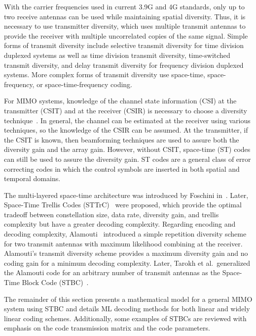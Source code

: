 
With the carrier frequencies used in current 3.9G and 4G standards, only up to two receive antennas can be used while maintaining spatial diversity. Thus, it is necessary to use transmitter diversity, which uses multiple transmit antennas to provide the receiver with multiple uncorrelated copies of the same signal. Simple forms of transmit diversity include selective transmit diversity for time division duplexed systems as well as time division transmit diversity, time-switched transmit diversity, and delay transmit diversity for frequency division duplexed systems. More complex forms of transmit diversity use space-time, space-frequency, or space-time-frequency coding.

For MIMO systems, knowledge of the channel state information (CSI) at the transmitter (CSIT) and at the receiver (CSIR) is necessary to choose a diversity technique~\cite{caire03,weingarten06}. In general, the channel can be estimated at the receiver using various techniques, so the knowledge of the CSIR can be assumed. At the transmitter, if the CSIT is known, then beamforming techniques are used to assure both the diversity gain and the array gain. However, without CSIT, space-time (ST) codes can still be used to assure the diversity gain. ST codes are a general class of error correcting codes in which the control symbols are inserted in both spatial and temporal domains.

The multi-layered space-time architecture was introduced by Foschini in~\cite{foschini96}. Later, Space-Time Trellis Codes (STTrC)~\cite{tarokh98} were proposed, which provide the optimal tradeoff between constellation size, data rate, diversity gain, and trellis complexity but have a greater decoding complexity. Regarding encoding and decoding complexity, Alamouti~\cite{alamouti98} introduced a simple repetition diversity scheme for two transmit antennas with maximum likelihood combining at the receiver. Alamouti's transmit diversity scheme provides a maximum diversity gain and no coding gain for a minimum decoding complexity. Later, Tarokh et al.\ generalized the Alamouti code for an arbitrary number of transmit antennas as the Space-Time Block Code (STBC)~\cite{tarokh99}.

The remainder of this section presents a mathematical model for a general MIMO system using STBC and details ML decoding methods for both linear and widely linear coding schemes. Additionally, some examples of STBCs are reviewed with emphasis on the code transmission matrix and the code parameters.

